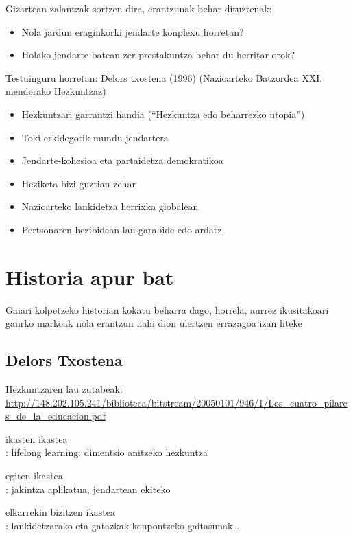 \documentclass[
]{book}
\providecommand{\tightlist}{%
  \setlength{\itemsep}{0pt}\setlength{\parskip}{0pt}}
\begin{document}
Gizartean zalantzak sortzen dira, erantzunak behar dituztenak:

\begin{itemize}
\tightlist
\item
  Nola jardun eraginkorki jendarte konplexu horretan?
\item
  Holako jendarte batean zer prestakuntza behar du herritar orok?
\end{itemize}

Testuinguru horretan: Delors txostena (1996) (Nazioarteko Batzordea XXI. menderako Hezkuntzaz)

\begin{itemize}
\tightlist
\item
  Hezkuntzari garrantzi handia (``Hezkuntza edo beharrezko utopia'')
\item
  Toki-erkidegotik mundu-jendartera
\item
  Jendarte-kohesioa eta partaidetza demokratikoa
\item
  Heziketa bizi guztian zehar
\item
  Nazioarteko lankidetza herrixka globalean
\item
  Pertsonaren hezibidean lau garabide edo ardatz
\end{itemize}

\hypertarget{historia-apur-bat}{%
\section{Historia apur bat}\label{historia-apur-bat}}

Gaiari kolpetzeko historian kokatu beharra dago, horrela, aurrez ikusitakoari gaurko markoak nola erantzun nahi dion ulertzen errazagoa izan liteke

\hypertarget{delors-txostena}{%
\subsection{Delors Txostena}\label{delors-txostena}}

Hezkuntzaren lau zutabeak: \url{http://148.202.105.241/biblioteca/bitstream/20050101/946/1/Los_cuatro_pilares_de_la_educacion.pdf}

ikasten ikastea\\
: lifelong learning; dimentsio anitzeko hezkuntza

egiten ikastea\\
: jakintza aplikatua, jendartean ekiteko

elkarrekin bizitzen ikastea\\
: lankidetzarako eta gatazkak konpontzeko gaitasunak\ldots{}
\end{document}

